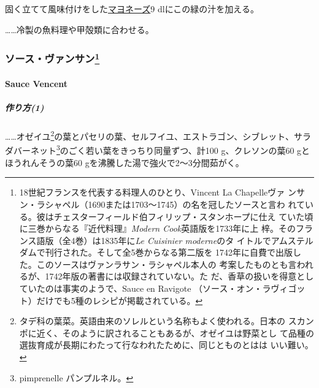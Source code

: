 \begin{recette}
固く立てて風味付けをした\protect\hyperlink{mayonnaise}{マヨネーズ}9
dlにこの緑の汁を加える。

\ldots{}\ldots{}冷製の魚料理や甲殻類に合わせる。

\maeaki

\hypertarget{ux30bdux30fcux30b9ux30f4ux30a1ux30f3ux30b5ux30f344}{%
\subsubsection[ソース・ヴァンサン]{\texorpdfstring{ソース・ヴァンサン\footnote{18世紀フランスを代表する料理人のひとり、Vincent
  La Chapelleヴァ
  ンサン・ラシャペル（1690または1703〜1745）の名を冠したソースと言わ
  れている。彼はチェスターフィールド伯フィリップ・スタンホープに仕え
  ていた頃に三巻からなる『近代料理』\emph{Modern Cook}英語版を1733年に上
  梓。そのフランス語版（全4巻）は1835年に\emph{Le Cuisinier moderne}のタ
  イトルでアムステルダムで刊行された。そして全5巻からなる第二版を
  1742年に自費で出版した。このソースはヴァンラサン・ラシャペル本人の
  考案したものとも言われるが、1742年版の著書には収録されていない。た
  だ、香草の扱いを得意としていたのは事実のようで、Sauce en Ravigote
  （ソース・オン・ラヴィゴット）だけでも5種のレシピが掲載されている。}}{ソース・ヴァンサン}}\label{ux30bdux30fcux30b9ux30f4ux30a1ux30f3ux30b5ux30f344}}

\hypertarget{sauce-vencent}{%
\paragraph{Sauce Vencent}\label{sauce-vencent}}


\hypertarget{ux4f5cux308aux65b91}{%
\subparagraph{作り方(1)}\label{ux4f5cux308aux65b91}}

\ldots{}\ldots{}オゼイユ\footnote{タデ科の葉菜。英語由来のソレルという名称もよく使われる。日本の
  スカンポに近く、そのように訳されることもあるが、オゼイユは野菜とし
  て品種の選抜育成が長期にわたって行なわれたために、同じとものとはは
  いい難い。}の葉とパセリの葉、セルフイユ、エストラゴン、シブレット、サラダバーネット\footnote{pimprenelle
  パンプルネル。}のごく若い葉をきっちり同量ずつ、計100 g、クレソンの葉60
gとほうれんそうの葉60 gを沸騰した湯で強火で2〜3分間茹がく。


\end{recette}
